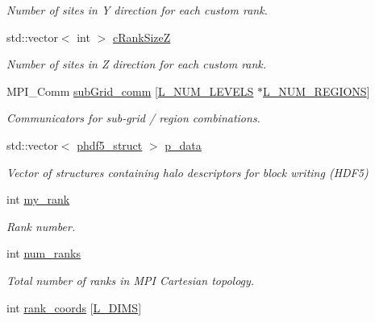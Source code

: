 \begin{DoxyCompactItemize}
\begin{DoxyCompactList}\small\item\em Number of sites in Y direction for each custom rank. \end{DoxyCompactList}\item 
std\+::vector$<$ int $>$ \hyperlink{class_mpi_manager_a17c2968f4c799dcadfa7bb8788eabaa1}{c\+Rank\+SizeZ}
\begin{DoxyCompactList}\small\item\em Number of sites in Z direction for each custom rank. \end{DoxyCompactList}\item 
M\+P\+I\+\_\+\+Comm \hyperlink{class_mpi_manager_a0926101699de914f6be018885bea25b1}{sub\+Grid\+\_\+comm} \mbox{[}\hyperlink{definitions_8h_a2ce7c3facc5f789b0e201757516539a5}{L\+\_\+\+N\+U\+M\+\_\+\+L\+E\+V\+E\+LS} $\ast$\hyperlink{definitions_8h_a3efeae83589481193d81da498e7f746a}{L\+\_\+\+N\+U\+M\+\_\+\+R\+E\+G\+I\+O\+NS}\mbox{]}
\begin{DoxyCompactList}\small\item\em Communicators for sub-\/grid / region combinations. \end{DoxyCompactList}\item 
std\+::vector$<$ \hyperlink{struct_mpi_manager_1_1phdf5__struct}{phdf5\+\_\+struct} $>$ \hyperlink{class_mpi_manager_a03972530e718d5b0a7f119e9c6132179}{p\+\_\+data}
\begin{DoxyCompactList}\small\item\em Vector of structures containing halo descriptors for block writing (H\+D\+F5) \end{DoxyCompactList}\item 
int \hyperlink{class_mpi_manager_a8329212abc23e5fa3e32e961b7823b5b}{my\+\_\+rank}
\begin{DoxyCompactList}\small\item\em Rank number. \end{DoxyCompactList}\item 
int \hyperlink{class_mpi_manager_af5156a5e4519f43230b6b84792464e48}{num\+\_\+ranks}
\begin{DoxyCompactList}\small\item\em Total number of ranks in M\+PI Cartesian topology. \end{DoxyCompactList}\item 
int \hyperlink{class_mpi_manager_a54a3ad1d90d1508ebc82f81655d917f8}{rank\+\_\+coords} \mbox{[}\hyperlink{definitions_8h_a31d5945080ee5c34edc32e6f74c724c8}{L\+\_\+\+D\+I\+MS}\mbox{]}

\end{DoxyCompactItemize}
